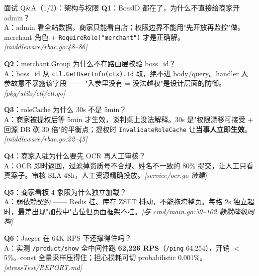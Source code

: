\documentclass[aspectratio=169,11pt]{beamer}
\begin{document}
\begin{frame}[shrink]{面试 Q\&A（1/2）：架构与权限}
\textbf{Q1}：BossID 都在了，为什么不直接给商家开 admin？\\
\hspace{4mm}\small A：admin 看全站数据，商家只能看自店；权限边界不能用"先开放再监控"做。merchant 角色 + \texttt{RequireRole("merchant")} 才是正确解。\textit{[middleware/rbac.go:48--86]}

\vspace{1mm}
\textbf{Q2}：merchant.Group 为什么不在路由层校验 boss\_id？\\
\hspace{4mm}\small A：boss\_id 从 \texttt{ctl.GetUserInfo(ctx).Id} 取，绝不进 body/query。handler 入参故意不暴露该字段 —— "入参里没有 = 没法越权"是设计层面的防御。\textit{[pkg/utils/ctl/ctl.go]}

\vspace{1mm}
\textbf{Q3}：roleCache 为什么 30s 不是 5min？\\
\hspace{4mm}\small A：商家被提权后等 5min 才生效，谈判桌上没法解释。30s 是"权限漂移可接受 + 回源 DB 砍 30 倍"的平衡点；提权时 \texttt{InvalidateRoleCache} 让\textbf{当事人立即生效}。\textit{[middleware/rbac.go:22--45]}

\vspace{1mm}
\textbf{Q4}：商家入驻为什么要先 OCR 再人工审核？\\
\hspace{4mm}\small A：OCR 即时返回，过滤掉资质号不合规、姓名不一致的 80\% 提交，让人工只看真案子。审核 SLA 48h，人工资源精确投放。\textit{[service/ocr.go 待建]}

\vspace{1mm}
\textbf{Q5}：商家看板 4 象限为什么独立加载？\\
\hspace{4mm}\small A：弱依赖契约 —— Redis 挂、库存 ZSET 抖动，不能拖垮整页。每格 2s 独立超时，最差出现"加载中"占位但页面框架不挂。\textit{[与 cmd/main.go:59--102 静默降级同构]}

\vspace{1mm}
\textbf{Q6}：Jaeger 在 64K RPS 下还撑得住吗？\\
\hspace{4mm}\small A：实测 \texttt{/product/show} 全中间件跑 \textbf{62{,}226 RPS}（\texttt{/ping} 64{,}254），开销 $<$ 5\%。const 全量采样压得住；担心损耗可切 probabilistic 0.001\%。\textit{[stressTest/REPORT.md]}
\end{frame}
\end{document}
